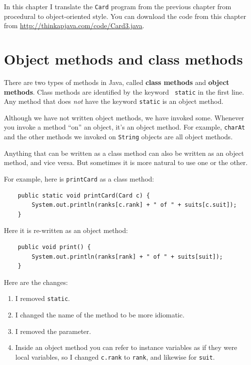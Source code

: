 \documentclass[12pt]{book}
\theoremstyle{exercise}
\begin{document}
In this chapter I translate the {\tt Card} program from the
previous chapter from procedural to object-oriented style.  You
can download the code from this chapter from
\url{http://thinkapjava.com/code/Card3.java}.


\section{Object methods and class methods}

There are two types of methods in Java, called {\bf class methods} and
{\bf object methods}.  Class methods are identified by the keyword {\tt
  static} in the first line.  Any method that does {\em not} have the
keyword {\tt static} is an object method.

Although we have not written object methods, we have invoked some.
Whenever you invoke a method ``on'' an object, it's an object method.
For example, {\tt charAt} and the other methods we invoked on {\tt String}
objects are all object methods.

Anything that can be written as a class method can also be written as an
object method, and vice versa.  But sometimes it is more natural to
use one or the other.

For example, here is {\tt printCard} as a class method:

\begin{lstlisting}
    public static void printCard(Card c) {
        System.out.println(ranks[c.rank] + " of " + suits[c.suit]);
    }
\end{lstlisting}

Here it is re-written as an object method:

\begin{lstlisting}
    public void print() {
        System.out.println(ranks[rank] + " of " + suits[suit]);
    }
\end{lstlisting}

Here are the changes:

\begin{enumerate}

\item I removed {\tt static}.

\item I changed the name of the method to be more idiomatic.

\item I removed the parameter.

\item Inside an object method you can refer to instance variables
as if they were local variables, so I changed {\tt c.rank} to {\tt rank},
and likewise for {\tt suit}.

\end{enumerate}
\end{document}
